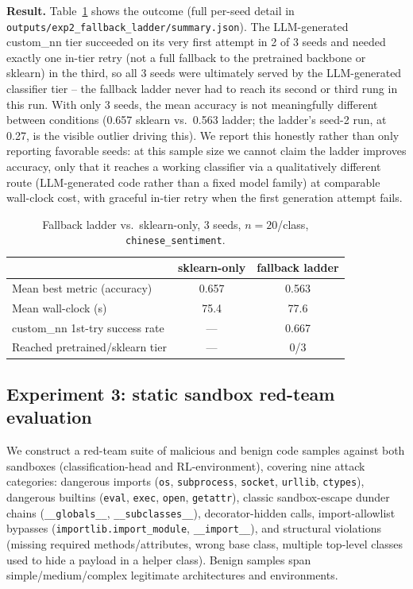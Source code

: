 \documentclass[10pt,twocolumn]{article}
\begin{document}
\textbf{Result.} Table~\ref{tab:exp2} shows the outcome (full per-seed
detail in \texttt{outputs/exp2\_fallback\_ladder/summary.json}). The
LLM-generated custom\_nn tier succeeded on its very first attempt in 2 of 3
seeds and needed exactly one in-tier retry (not a full fallback to the
pretrained backbone or sklearn) in the third, so all 3 seeds were ultimately
served by the LLM-generated classifier tier -- the fallback ladder never had
to reach its second or third rung in this run. With only 3 seeds, the mean
accuracy is not meaningfully different between conditions (0.657 sklearn vs.\
0.563 ladder; the ladder's seed-2 run, at 0.27, is the visible outlier
driving this). We report this honestly rather than only reporting favorable
seeds: at this sample size we cannot claim the ladder improves accuracy,
only that it reaches a working classifier via a qualitatively different
route (LLM-generated code rather than a fixed model family) at comparable
wall-clock cost, with graceful in-tier retry when the first generation
attempt fails.

\begin{table}[t]
\centering
\caption{Fallback ladder vs.\ sklearn-only, 3 seeds, $n{=}20$/class, \texttt{chinese\_sentiment}.}
\label{tab:exp2}
\small
\begin{tabular}{lcc}
\toprule
 & sklearn-only & fallback ladder \\
\midrule
Mean best metric (accuracy) & 0.657 & 0.563 \\
Mean wall-clock (s)         & 75.4  & 77.6 \\
custom\_nn 1st-try success rate & --- & 0.667 \\
Reached pretrained/sklearn tier & --- & 0/3 \\
\bottomrule
\end{tabular}
\end{table}

\subsection{Experiment 3: static sandbox red-team evaluation}
\label{sec:exp3}

We construct a red-team suite of malicious and benign code samples against
both sandboxes (classification-head and RL-environment), covering nine
attack categories: dangerous imports (\texttt{os}, \texttt{subprocess},
\texttt{socket}, \texttt{urllib}, \texttt{ctypes}), dangerous builtins
(\texttt{eval}, \texttt{exec}, \texttt{open}, \texttt{getattr}), classic
sandbox-escape dunder chains (\texttt{\_\_globals\_\_},
\texttt{\_\_subclasses\_\_}), decorator-hidden calls, import-allowlist
bypasses (\texttt{importlib.import\_module}, \texttt{\_\_import\_\_}), and
structural violations (missing required methods/attributes, wrong base
class, multiple top-level classes used to hide a payload in a helper class).
Benign samples span simple/medium/complex legitimate architectures and
environments.
\end{document}

